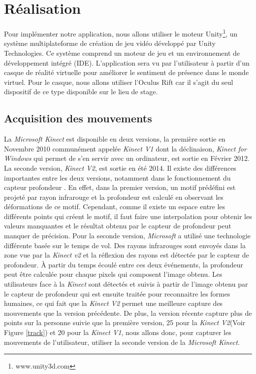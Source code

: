 \section{R\'{e}alisation}
Pour implémenter notre application, nous allons utiliser le moteur Unity\footnote{www.unity3d.com}, un système multiplateforme de création de jeu vidéo développé par Unity Technologies. Ce système comprend un moteur de jeu et un environnement de développement intégré (IDE). L'application sera vu par l'utilisateur à partir d'un casque de réalité virtuelle pour améliorer le sentiment de présence dans le monde virtuel. Pour le casque, nous allons utiliser l'Oculus Rift \cite{oc12} car il s'agit du seul dispositif de ce type disponible sur le lieu de stage.
\subsection{Acquisition des mouvements}
La \emph{Microsoft Kinect} est disponible en deux versions, la première sortie en Novembre 2010 communément appelée \emph{Kinect V1} dont la déclinaison, \emph{Kinect for Windows} qui permet de s'en servir avec un ordinateur, est sortie en Février 2012. La seconde version, \emph{Kinect V2}, est sortie en été 2014. Il existe des différences importantes entre les deux versions, notamment dans le fonctionnement du capteur profondeur \cite{lu15}. En effet, dans la premier version, un motif prédéfini est projeté par rayon infrarouge et la profondeur est calculé en observant les déformations de ce motif. Cependant, comme il existe un espace entre les différents points qui créent le motif, il faut faire une interpolation pour obtenir les valeurs manquantes et le résultat obtenu par le capteur de profondeur peut manquer de précision. Pour la seconde version, \emph{Microsoft} a utilisé une technologie différente basée sur le temps de vol. Des rayons infrarouges sont envoyés dans la zone vue par la \emph{Kinect v2} et la réflexion des rayons est détectée par le capteur de profondeur. \`{A} partir du temps écoulé entre ces deux événements, la profondeur peut être calculée pour chaque pixels qui composent l'image obtenu. Les utilisateurs face à la \emph{Kinect} sont détectés et suivis à partir de l'image obtenu par le capteur de profondeur qui est ensuite traitée pour reconnaitre les formes humaines, ce qui fait que la \emph{Kinect V2} permet une meilleure capture des mouvements que la version précédente. De plus, la version récente capture plus de points sur la personne suivie que la première version, 25 pour la \emph{Kinect V2}(Voir Figure \ref{track}) et 20 pour la \emph{Kinect V1}, nous allons donc, pour capturer les mouvements de l'utilisateur, utiliser la seconde version de la \emph{Microsoft Kinect}.\\

